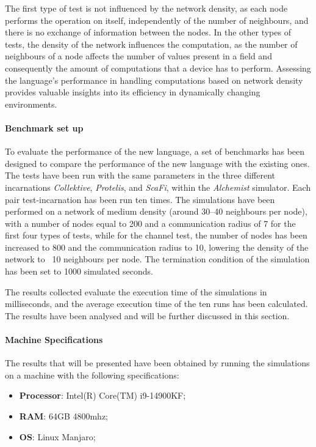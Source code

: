 The first type of test is not influenced by the network density, as each node performs the operation on itself,
independently of the number of neighbours, and there is no exchange of information between the nodes.
In the other types of tests, the density of the network influences the computation, as the number of neighbours of a node
affects the number of values present in a field and consequently the amount of computations that a device has to perform.
Assessing the language's performance in handling computations based on network density provides valuable insights into
its efficiency in dynamically changing environments.

\paragraph{Benchmark set up}
To evaluate the performance of the new language, a set of benchmarks has been designed to compare the performance of the
new language with the existing ones.
The tests have been run with the same parameters in the three different incarnations \emph{Collektive}, \emph{Protelis}, and \emph{ScaFi},
within the \emph{Alchemist} simulator.
Each pair test-incarnation has been run ten times.
The simulations have been performed on a network of medium density (around 30--40 neighbours per node), with a number of
nodes equal to 200 and a communication radius of 7 for the first four types of tests, while for the channel test,
the number of nodes has been increased to 800 and the communication radius to 10, lowering the density of the network to ~10 neighbours per node.
The termination condition of the simulation has been set to 1000 simulated seconds.

The results collected evaluate the execution time of the simulations in milliseconds, and the average execution time of
the ten runs has been calculated.
The results have been analysed and will be further discussed in this section.

\paragraph{Machine Specifications}
The results that will be presented have been obtained by running the simulations on a machine with the following specifications:
\begin{itemize}
    \item \textbf{Processor}: Intel(R) Core(TM) i9-14900KF;
    \item \textbf{RAM}: 64GB 4800mhz;
    \item \textbf{OS}: Linux Manjaro;
\end{itemize}

